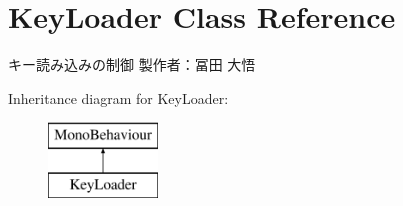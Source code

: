 \hypertarget{class_key_loader}{}\section{Key\+Loader Class Reference}
\label{class_key_loader}


キー読み込みの制御 製作者：冨田 大悟  


Inheritance diagram for Key\+Loader\+:\begin{figure}[H]
\begin{center}
\leavevmode
\includegraphics[height=2.000000cm]{class_key_loader}
\end{center}
\end{figure}
